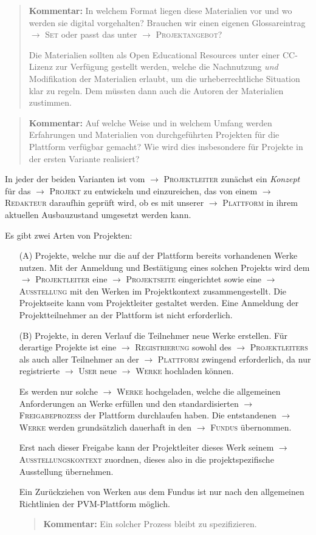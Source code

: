 \documentclass[a4paper,11pt]{article}
\newcommand{\Kommentar}[1]{
  \begin{quote}\textbf{Kommentar:} #1 \end{quote}
}
\newcommand{\glossar}[1]{{$\to$ \textsc{#1}}}
\begin{document}
\Kommentar{In welchem Format liegen diese Materialien vor und wo werden sie
  digital vorgehalten? Brauchen wir einen eigenen Glossareintrag \glossar{Set}
  oder passt das unter \glossar{Projektangebot}? 

  Die Materialien sollten als Open Educational Resources unter einer
  CC-Lizenz zur Verfügung gestellt werden, welche die Nachnutzung \emph{und}
  Modifikation der Materialien erlaubt, um die urheberrechtliche Situation klar
  zu regeln.  Dem müssten dann auch die Autoren der Materialien zustimmen. } 

\Kommentar{Auf welche Weise und in welchem Umfang werden Erfahrungen und
  Materialien von durchgeführten Projekten für die Plattform verfügbar gemacht?
  Wie wird dies insbesondere für Projekte in der ersten Variante realisiert? }

In jeder der beiden Varianten ist vom \glossar{Projektleiter} zunächst ein
\emph{Konzept} für das \glossar{Projekt} zu entwickeln und einzureichen, das
von einem \glossar{Redakteur} daraufhin geprüft wird, ob es mit unserer
\glossar{Plattform} in ihrem aktuellen Ausbauzustand umgesetzt werden kann.

Es gibt zwei Arten von Projekten:
\begin{itemize}
\item [(A)] Projekte, welche nur die auf der Plattform bereits vorhandenen
  Werke nutzen. Mit der Anmeldung und Bestätigung eines solchen Projekts wird
  dem \glossar{Projektleiter} eine \glossar{Projektseite} eingerichtet sowie
  eine \glossar{Ausstellung} mit den Werken im Projektkontext zusammengestellt.
  Die Projektseite kann vom Projektleiter gestaltet werden. Eine Anmeldung der
  Projektteilnehmer an der Plattform ist nicht erforderlich.
\item [(B)] Projekte, in deren Verlauf die Teilnehmer neue Werke erstellen.
  Für derartige Projekte ist eine \glossar{Registrierung} sowohl des
  \glossar{Projektleiters} als auch aller Teilnehmer an der \glossar{Plattform}
  zwingend erforderlich, da nur registrierte \glossar{User} neue
  \glossar{Werke} hochladen können. 

  Es werden nur solche \glossar{Werke} hochgeladen, welche die allgemeinen
  Anforderungen an Werke erfüllen und den standardisierten
  \glossar{Freigabeprozess} der Plattform durchlaufen haben.  Die entstandenen
  \glossar{Werke} werden grundsätzlich dauerhaft in den \glossar{Fundus}
  übernommen.

  Erst nach dieser Freigabe kann der Projektleiter dieses Werk seinem
  \glossar{Ausstellungskontext} zuordnen, dieses also in die projektspezifische
  Ausstellung übernehmen.

  Ein Zurückziehen von Werken aus dem Fundus ist nur nach den allgemeinen
  Richtlinien der PVM-Plattform möglich.

  \Kommentar{Ein solcher Prozess bleibt zu spezifizieren.}

\end{itemize}
\end{document}
